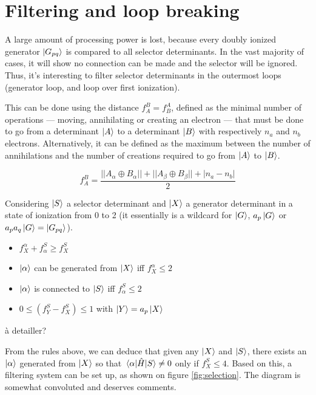 \documentclass[./thesis.tex]{subfiles}
\begin{document}
\section{Filtering and loop breaking}
A large amount of processing power is lost, because every doubly ionized generator $\ket {G_{pq}}$ is compared to all selector determinants. In the vast majority of cases, it will show no connection can be made and the selector will be ignored. Thus, it's interesting to filter selector determinants in the outermost loops (generator loop, and loop over first ionization).

This can be done using the distance $f_A^B = f_B^A$, defined as the minimal number of operations --- moving, annihilating or creating an electron --- that must be done to go from a determinant $\ket A$ to a determinant $\ket B$ with respectively $n_a$ and $n_b$ electrons.
Alternatively, it can be defined as the maximum between the number of annihilations and the number of creations required to go from $\ket A$ to $\ket B$.



\begin{equation}
f_A^B = \frac{||A_\alpha \oplus B_\alpha|| + ||A_\beta \oplus B_\beta|| + |n_a-n_b|}{2}
\end{equation}


Considering $\ket S$ a selector determinant and $\ket X$ a generator determinant in a state of ionization from 0 to 2 (it essentially is a wildcard for $\ket G$, $a_{p} \ket G$ or $a_{p} a_{q} \ket G = \ket {G_{pq}}$).

\begin{itemize}
\item
$f_X^\alpha + f_\alpha^S \geq f_X^S$
\item
$\ket \alpha$ can be generated from $\ket X$ iff $f_X^\alpha \leq 2$
\item
$\ket \alpha$ is connected to $\ket S$ iff $f_\alpha^S \leq 2$
\item
$0 \leq (f_Y^S - f_X^S) \leq 1$ with $\ket Y = a_p \ket X$
\end{itemize}

\alert{à detailler?}

From the rules above, we can deduce that given any $\ket X$ and $\ket S$, there exists an ${\ket{\alpha}}$ generated from $\ket X$ so that $\mel{\alpha}{\hat{H}}{S} \neq 0$ only if $f_X^S \leq 4$.
Based on this, a filtering system can be set up, as shown on figure \ref{fig:selection}. The diagram is somewhat convoluted and deserves comments.
\end{document}
